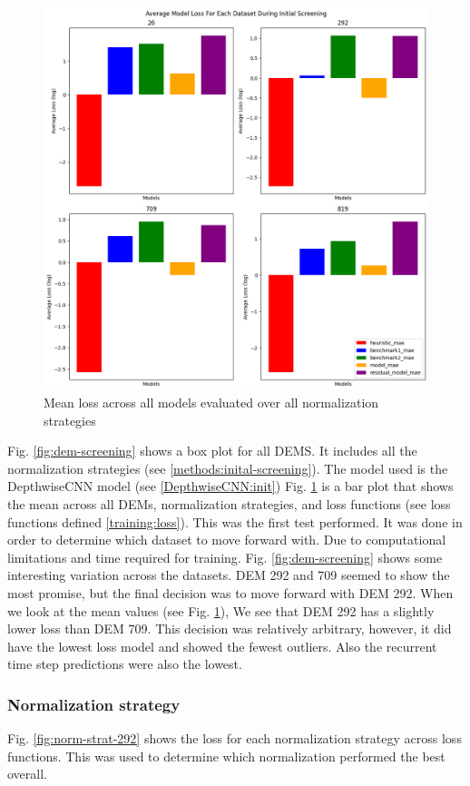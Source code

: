 \begin{figure}[htbp]
	\centering
	\includegraphics[width=0.9\linewidth, height=0.7\linewidth]{"Figures/Results/Initial screening/DEM screening plots/Data_Set_Dem_Screening_Log"}
	\caption[Mean Loss Across DEMs]{Mean loss across all models evaluated over all normalization strategies}
	\label{fig:mean-dem-screening}
\end{figure}

Fig. \ref{fig:dem-screening} shows a box plot for all DEMS. It includes all the normalization strategies (see \ref{methods:inital-screening}). The model used is the DepthwiseCNN model (see \ref{DepthwiseCNN:init}) Fig. \ref{fig:mean-dem-screening} is a bar plot that shows the mean across all DEMs, normalization strategies, and loss functions (see loss functions defined \ref{training:loss}). This was the first test performed. It was done in order to determine which dataset to move forward with. Due to computational limitations and time required for training. Fig. \ref{fig:dem-screening} shows some interesting variation across the datasets. DEM 292 and 709 seemed to show the most promise, but the final decision was to move forward with DEM 292. When we look at the mean values (see Fig. \ref{fig:mean-dem-screening}), We see that DEM 292 has a slightly lower loss than DEM 709. This decision was relatively arbitrary, however, it did have the lowest loss model and showed the fewest outliers. Also the recurrent time step predictions were also the lowest.

\subsubsection*{Normalization strategy}
Fig. \ref{fig:norm-strat-292} shows the loss for each normalization strategy across loss functions. This was used to determine which normalization performed the best overall.

